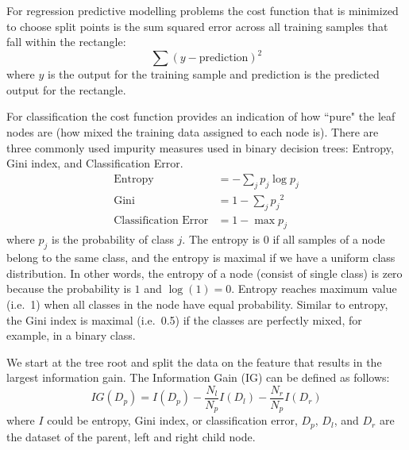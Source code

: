 \documentclass{book}
\begin{document}
For regression predictive modelling problems the cost function that is minimized to choose split points is the sum squared error across all training samples that fall within the rectangle:
\begin{equation*}
\sum(y-\mbox{prediction})^2
\end{equation*}
where $y$ is the output for the training sample and prediction is the predicted output for the rectangle.

For classification the cost function provides an indication of how ``pure" the leaf nodes are (how mixed the training data assigned to each node is). There are three commonly used impurity measures used in binary decision trees: Entropy, Gini index, and Classification Error.
\begin{align*}
\mbox{Entropy} &= - \sum_j p_j \log p_j \\
\mbox{Gini} &= 1 - \sum_j {p_j}^2 \\
\mbox{Classification Error} &= 1 - \max {p_j}
\end{align*}
where $p_j$ is the probability of class $j$.
The entropy is $0$ if all samples of a node belong to the same class, and the entropy is maximal if we have a uniform class distribution. In other words, the entropy of a node (consist of single class) is zero because the probability is $1$ and $\log (1) = 0$. Entropy reaches maximum value (i.e.\ 1) when all classes in the node have equal probability. Similar to entropy, the Gini index is maximal (i.e.\ 0.5) if the classes are perfectly mixed, for example, in a binary class.

We start at the tree root and split the data on the feature that results in the largest information gain. The Information Gain (IG) can be defined as follows:
\begin{equation*}
{IG}(D_p) = I(D_p) - \frac{N_{l}}{N_p}I(D_{l}) - \frac{N_{r}}{N_p}I(D_{r})
\end{equation*}
where $I$ could be entropy, Gini index, or classification error, $D_p$, $D_l$, and $D_r$ are the dataset of the parent, left and right child node.

\end{document}
